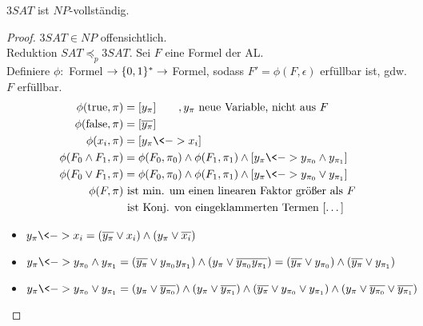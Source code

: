 \begin{Satz}[name={[$3SAT$ ist $NP$-vollständig]}]
	$3SAT$ ist $NP$-vollständig.
\end{Satz}
\begin{proof}
	$3SAT \in NP$ offensichtlich.\\
	Reduktion $SAT \preceq_p 3SAT$. Sei $F$ eine Formel der \ac{AL}.\\
	Definiere $\phi: $ Formel $\->\{0,1\}^*\->$ Formel, sodass $F' = \phi(F,\epsilon)$ erfüllbar ist, gdw. $F$ erfüllbar.
	\begin{align*}
		\phi(\text{true},\pi) &= [y_\pi] \qquad, y_\pi\text{ neue Variable, nicht aus }F\\
		\phi(\text{false},\pi) &= [\overline{y_\pi}]\\
		\phi(x_i,\pi) &= [y_\pi \<-> x_i]\\
		\phi(F_0\land F_1,\pi) &= \phi(F_0,\pi_0)\land\phi(F_1,\pi_1)\land [y_\pi\<->y_{\pi_0}\land y_{\pi_1}]\\
		\phi(F_0\lor F_1,\pi) &= \phi(F_0,\pi_0)\land\phi(F_1,\pi_1)\land [y_\pi\<->y_{\pi_0}\lor y_{\pi_1}]\\
		\phi(F,\pi) &\text{ ist min. um einen linearen Faktor größer als }F\\
		&\text{ ist Konj. von eingeklammerten Termen }[\dots]
	\end{align*}
	\begin{itemize}
	\item $y_\pi \<-> x_i = (\overline{y_\pi}\lor x_i)\land(y_\pi\lor \overline{x_i})$
	\item $y_\pi\<-> y_{\pi_0}\land y_{\pi_1}
		= (\overline{y_\pi}\lor y_{\pi_0}y_{\pi_1})
		\land (y_\pi\lor \overline{y_{\pi_0}y_{\pi_1}})
		= (\overline{y_\pi}\lor y_{\pi_0})
		\land (\overline{y_\pi}\lor y_{\pi_1})$
	\item $y_\pi\<-> y_{\pi_0}\lor y_{\pi_1}
		= (y_\pi\lor \overline{y_{\pi_0}})
		\land (y_\pi\lor\overline{y_{\pi_1}})
		\land (\overline{y_\pi}\lor y_{\pi_0}\lor y_{\pi_1})
		\land (y_\pi \lor \overline{y_{\pi_0}} \lor \overline{y_{\pi_1}})$
	\end{itemize}
\end{proof}

